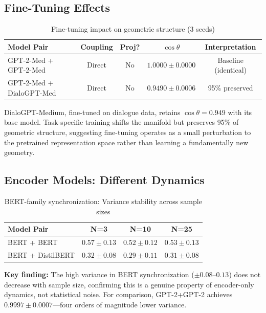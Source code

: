 \documentclass[10pt]{article} %
\theoremstyle{plain}
\theoremstyle{definition}
\theoremstyle{remark}
\begin{document}
\subsection{Fine-Tuning Effects}

\begin{table}[htbp]
\centering
\caption{Fine-tuning impact on geometric structure (3 seeds)}
\label{tab:finetuning}
\small
\begin{tabular}{lcccc}
\toprule
\textbf{Model Pair} & \textbf{Coupling} & \textbf{Proj?} & \textbf{$\cos \theta$} & \textbf{Interpretation} \\
\midrule
GPT-2-Med + GPT-2-Med & Direct & No & $1.0000 \pm 0.0000$ & Baseline (identical) \\
GPT-2-Med + DialoGPT-Med & Direct & No & $\mathbf{0.9490 \pm 0.0006}$ & 95\% preserved \\
\bottomrule
\end{tabular}
\end{table}

DialoGPT-Medium, fine-tuned on dialogue data, retains $\cos \theta = 0.949$ with its base model. Task-specific training shifts the manifold but preserves 95\% of geometric structure, suggesting fine-tuning operates as a small perturbation to the pretrained representation space rather than learning a fundamentally new geometry.

\subsection{Encoder Models: Different Dynamics}

\begin{table}[htbp]
\centering
\caption{BERT-family synchronization: Variance stability across sample sizes}
\label{tab:bert}
\small
\begin{tabular}{lccc}
\toprule
\textbf{Model Pair} & \textbf{N=3} & \textbf{N=10} & \textbf{N=25} \\
\midrule
BERT + BERT & $0.57 \pm 0.13$ & $0.52 \pm 0.12$ & $0.53 \pm 0.13$ \\
BERT + DistilBERT & $0.32 \pm 0.08$ & $0.29 \pm 0.11$ & $0.31 \pm 0.08$ \\
\bottomrule
\end{tabular}
\end{table}

\textbf{Key finding:} The high variance in BERT synchronization ($\pm 0.08$--$0.13$) does not decrease with sample size, confirming this is a genuine property of encoder-only dynamics, not statistical noise. For comparison, GPT-2+GPT-2 achieves $0.9997 \pm 0.0007$---four orders of magnitude lower variance.
\end{document}
